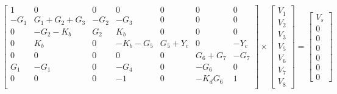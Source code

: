 \begin{equation}
\left[ \begin{array}{ccccccc} 
		1 & 0 & 0 & 0 & 0 & 0 & 0 \\ 
		-G_1 & G_1+G_2+G_3 & -G_2 & -G_3 & 0 & 0 & 0 \\
		0 & -G_2-K_b & G_2 & K_b & 0 & 0 & 0 \\ 
		0 & K_b & 0 & -K_b-G_5 & G_5+Y_c & 0 & -Y_c  \\ 
		0 & 0 & 0 & 0 & 0 & G_6+G_7 & -G_7  \\ 
		G_1 & -G_1 & 0 & -G_4 & 0 & -G_6 & 0  \\ 
		0 & 0 & 0 & -1 & 0 & -K_dG_6 & 1 \\ 

\end{array} \right]
\times \left[ \begin{array}{c} V_1 \\ V_2 \\ V_3 \\  V_5 \\ V_6 \\ V_7 \\ V_8 \end{array} \right] =
\left[ \begin{array}{c} V_s \\ 0 \\ 0 \\ 0 \\ 0 \\ 0 \\ 0  \end{array} \right]
\label{eq:nodalmatrix4}
\end{equation}








